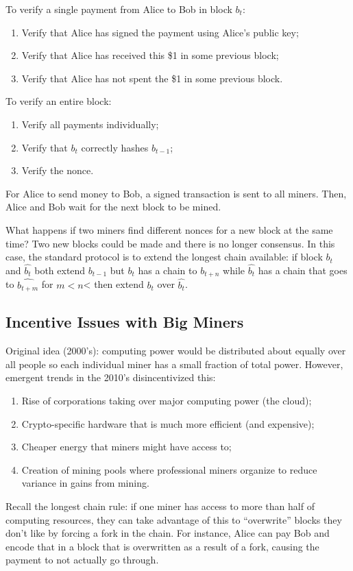 \documentclass[dvipsnames]{article}
\theoremstyle{definition}
\theoremstyle{remark}
\begin{document}
To verify a single payment from Alice to Bob in block $b_t$:
\begin{enumerate}
	\item Verify that Alice has signed the payment using Alice's public key;
	\item Verify that Alice has received this \$1 in some previous block;
	\item Verify that Alice has not spent the \$1 in some previous block.
\end{enumerate}
To verify an entire block:
\begin{enumerate}
	\item Verify all payments individually;
	\item Verify that $b_t$ correctly hashes $b_{t-1}$;
	\item Verify the nonce.
\end{enumerate}
For Alice to send money to Bob, a signed transaction is sent to all miners. Then, Alice and Bob wait for the next block to be mined.

What happens if two miners find different nonces for a new block at the same time? Two new blocks could be made and there is no longer consensus. In this case, the standard protocol is to extend the longest chain available: if block $b_t$ and $\hat{b_t}$ both extend $b_{t-1}$ but $b_t$ has a chain to $b_{t+n}$ while $\hat{b_t}$ has a chain that goes to $\hat{b_{t+m}}$ for $m < n$< then extend $b_t$ over $\hat{b_t}$.

\subsection{Incentive Issues with Big Miners}
Original idea (2000's): computing power would be distributed about equally over all people so each individual miner has a small fraction of total power. However, emergent trends in the 2010's disincentivized this:
\begin{enumerate}
	\item Rise of corporations taking over major computing power (the cloud);
	\item Crypto-specific hardware that is much more efficient (and expensive);
	\item Cheaper energy that miners might have access to;
	\item Creation of mining pools where professional miners organize to reduce variance in gains from mining.
\end{enumerate}

Recall the longest chain rule: if one miner has access to more than half of computing resources, they can take advantage of this to ``overwrite'' blocks they don't like by forcing a fork in the chain. For instance, Alice can pay Bob and encode that in a block that is overwritten as a result of a fork, causing the payment to not actually go through.
\end{document}
